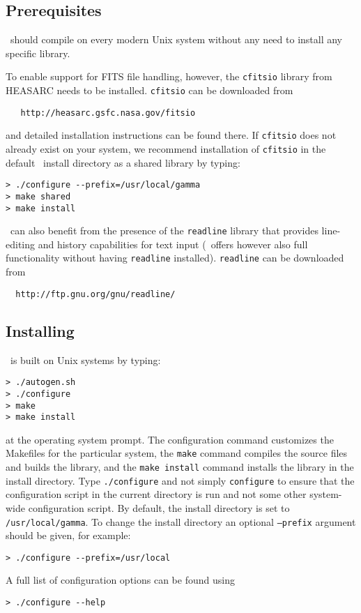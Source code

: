 \documentclass{article}[12pt,a4]
\begin{document}
\subsection{Prerequisites}

\this\ should compile on every modern Unix system without any need to install any
specific library.

To enable support for FITS file handling, however, the {\tt cfitsio} library from HEASARC
needs to be installed.
{\tt cfitsio} can be downloaded from
\begin{verbatim}
   http://heasarc.gsfc.nasa.gov/fitsio
\end{verbatim}
and detailed installation instructions can be found there.
If {\tt cfitsio} does not already exist on your system, we recommend installation of {\tt cfitsio}
in the default \this\ install directory as a shared library by typing:
\begin{verbatim}
> ./configure --prefix=/usr/local/gamma
> make shared
> make install
\end{verbatim}

\this\ can also benefit from the presence of the {\tt readline} library that provides line-editing
and history capabilities for text input (\this\ offers however also full functionality without having
{\tt readline} installed).
{\tt readline} can be downloaded from
\begin{verbatim}
  http://ftp.gnu.org/gnu/readline/
\end{verbatim}


\subsection{Installing \this}

\this\ is built on Unix systems by typing:
\begin{verbatim}
> ./autogen.sh
> ./configure
> make
> make install
\end{verbatim}
at the operating system prompt.
The configuration command customizes the Makefiles for the particular system,
the {\tt make} command compiles the source files and builds the library, and
the {\tt make install} command installs the library in the install directory.
Type {\tt ./configure} and not simply {\tt configure} to ensure that the configuration
script in the current directory is run and not some other system-wide configuration
script.
By default, the install directory is set to
{\tt /usr/local/gamma}.
To change the install directory an optional {\tt --prefix} argument should be given,
for example:
\begin{verbatim}
> ./configure --prefix=/usr/local
\end{verbatim}
A full list of configuration options can be found using
\begin{verbatim}
> ./configure --help
\end{verbatim}
\end{document}
